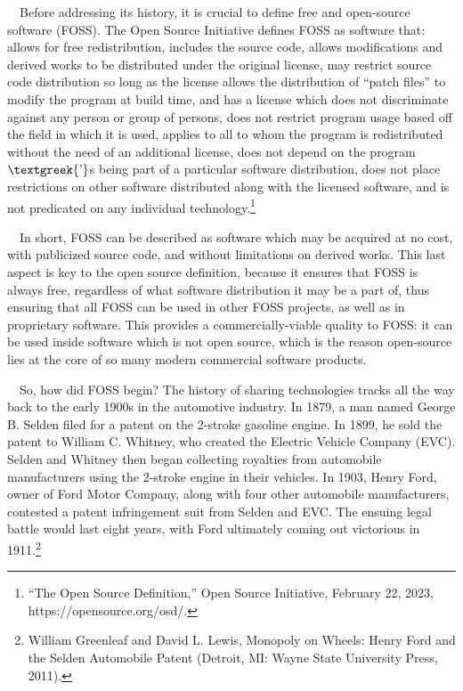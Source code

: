 \documentclass{article}
\begin{document}
\ \ Before addressing its history, it is crucial to define free and open-source software (FOSS). The Open Source
Initiative defines FOSS as software that: allows for free redistribution, includes the source code, allows
modifications and derived works to be distributed under the original license, may restrict source code distribution so
long as the license allows the distribution of “patch files” to modify the program at build time, and has a license
which does not discriminate against any person or group of persons, does not restrict program usage based off the field
in which it is used, applies to all to whom the program is redistributed without the need of an additional license,
does not depend on the program$\text{\textgreek{’}}$s being part of a particular software distribution, does not place
restrictions on other software distributed along with the licensed software, and is not predicated on any individual
technology.\footnote{“The Open Source Definition,” Open Source Initiative, February 22, 2023,
https://opensource.org/osd/.}

\ \ In short, FOSS can be described as software which may be acquired at no cost, with publicized source code, and
without limitations on derived works. This last aspect is key to the open source definition, because it ensures that
FOSS is always free, regardless of what software distribution it may be a part of, thus ensuring that all FOSS can be
used in other FOSS projects, as well as in proprietary software. This provides a commercially-viable quality to FOSS:
it can be used inside software which is not open source, which is the reason open-source lies at the core of so many
modern commercial software products.

\ \ So, how did FOSS begin? The history of sharing technologies tracks all the way back to the early 1900s in the
automotive industry. In 1879, a man named George B. Selden filed for a patent on the 2-stroke gasoline engine. In 1899,
he sold the patent to William C. Whitney, who created the Electric Vehicle Company (EVC). Selden and Whitney then began
collecting royalties from automobile manufacturers using the 2-stroke engine in their vehicles. In 1903, Henry Ford,
owner of Ford Motor Company, along with four other automobile manufacturers, contested a patent infringement suit from
Selden and EVC. The ensuing legal battle would last eight years, with Ford ultimately coming out victorious in
1911.\footnote{William Greenleaf and David L. Lewis, Monopoly on Wheels: Henry Ford and the Selden Automobile Patent
(Detroit, MI: Wayne State University Press, 2011).}
\end{document}
